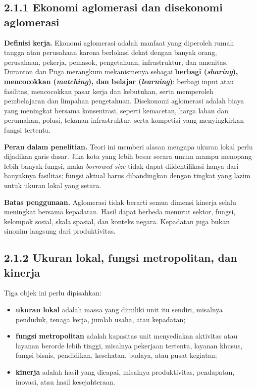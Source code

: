\documentclass[
  indonesian,
  11pt,
  a4paper,
  oneside,
  openany]{report}
\providecommand{\tightlist}{%
  \setlength{\itemsep}{0pt}\setlength{\parskip}{0pt}}
\begin{document}
\subsection{2.1.1 Ekonomi aglomerasi dan disekonomi
aglomerasi}\label{ekonomi-aglomerasi-dan-disekonomi-aglomerasi}

\textbf{Definisi kerja.} Ekonomi aglomerasi adalah manfaat yang
diperoleh rumah tangga atau perusahaan karena berlokasi dekat dengan
banyak orang, perusahaan, pekerja, pemasok, pengetahuan, infrastruktur,
dan amenitas. Duranton dan Puga merangkum mekanismenya sebagai
\textbf{berbagi (\emph{sharing}), mencocokkan (\emph{matching}), dan
belajar (\emph{learning})}: berbagi input atau fasilitas, mencocokkan
pasar kerja dan kebutuhan, serta memperoleh pembelajaran dan limpahan
pengetahuan. Disekonomi aglomerasi adalah biaya yang meningkat bersama
konsentrasi, seperti kemacetan, harga lahan dan perumahan, polusi,
tekanan infrastruktur, serta kompetisi yang menyingkirkan fungsi
tertentu.

\textbf{Peran dalam penelitian.} Teori ini memberi alasan mengapa ukuran
lokal perlu dijadikan garis dasar. Jika kota yang lebih besar secara
umum mampu menopang lebih banyak fungsi, maka \emph{borrowed size} tidak
dapat diidentifikasi hanya dari banyaknya fasilitas; fungsi aktual harus
dibandingkan dengan tingkat yang lazim untuk ukuran lokal yang setara.

\textbf{Batas penggunaan.} Aglomerasi tidak berarti semua dimensi
kinerja selalu meningkat bersama kepadatan. Hasil dapat berbeda menurut
sektor, fungsi, kelompok sosial, skala spasial, dan konteks negara.
Kepadatan juga bukan sinonim langsung dari produktivitas.

\subsection{2.1.2 Ukuran lokal, fungsi metropolitan, dan
kinerja}\label{ukuran-lokal-fungsi-metropolitan-dan-kinerja}

Tiga objek ini perlu dipisahkan:

\begin{itemize}
\tightlist
\item
  \textbf{ukuran lokal} adalah massa yang dimiliki unit itu sendiri,
  misalnya penduduk, tenaga kerja, jumlah usaha, atau kepadatan;
\item
  \textbf{fungsi metropolitan} adalah kapasitas unit menyediakan
  aktivitas atau layanan berorde lebih tinggi, misalnya pekerjaan
  tertentu, layanan khusus, fungsi bisnis, pendidikan, kesehatan,
  budaya, atau pusat kegiatan;
\item
  \textbf{kinerja} adalah hasil yang dicapai, misalnya produktivitas,
  pendapatan, inovasi, atau hasil kesejahteraan.
\end{itemize}
\end{document}
